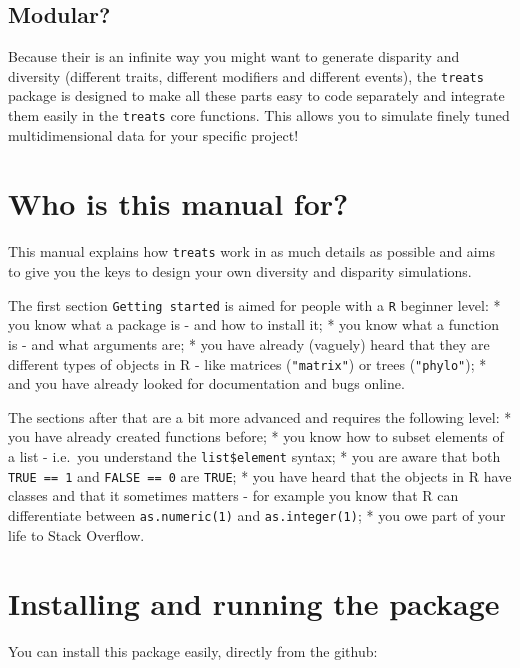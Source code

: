 \documentclass[
]{book}
\begin{document}
\hypertarget{modular}{%
\subsection{Modular?}\label{modular}}

Because their is an infinite way you might want to generate disparity and diversity (different traits, different modifiers and different events), the \texttt{treats} package is designed to make all these parts easy to code separately and integrate them easily in the \texttt{treats} core functions.
This allows you to simulate finely tuned multidimensional data for your specific project!

\hypertarget{who-is-this-manual-for}{%
\section{Who is this manual for?}\label{who-is-this-manual-for}}

This manual explains how \texttt{treats} work in as much details as possible and aims to give you the keys to design your own diversity and disparity simulations.

The first section \texttt{Getting\ started} is aimed for people with a \texttt{R} beginner level:
* you know what a package is - and how to install it;
* you know what a function is - and what arguments are;
* you have already (vaguely) heard that they are different types of objects in R - like matrices (\texttt{"matrix"}) or trees (\texttt{"phylo"});
* and you have already looked for documentation and bugs online.

The sections after that are a bit more advanced and requires the following level:
* you have already created functions before;
* you know how to subset elements of a list - i.e.~you understand the \texttt{list\$element} syntax;
* you are aware that both \texttt{TRUE\ ==\ 1} and \texttt{FALSE\ ==\ 0} are \texttt{TRUE};
* you have heard that the objects in R have classes and that it sometimes matters - for example you know that R can differentiate between \texttt{as.numeric(1)} and \texttt{as.integer(1)};
* you owe part of your life to Stack Overflow.

\hypertarget{installing-and-running-the-package}{%
\section{Installing and running the package}\label{installing-and-running-the-package}}

You can install this package easily, directly from the github:
\end{document}
